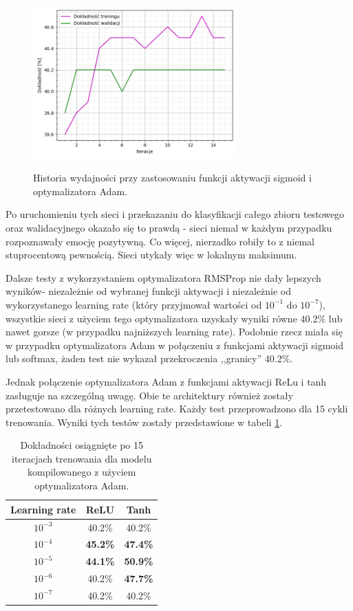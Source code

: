 \begin{figure}[H]
    \caption{Historia wydajności przy zastosowaniu funkcji aktywacji sigmoid i optymalizatora Adam.}
    \centering
    \includegraphics[width=0.7\textwidth]{wykres1.png}
    \label{pic:5.1}
\end{figure}

Po uruchomieniu tych sieci i przekazaniu do klasyfikacji całego zbioru testowego oraz walidacyjnego okazało się to prawdą - sieci niemal w każdym przypadku rozpoznawały emocję pozytywną. Co więcej, nierzadko robiły to z niemal stuprocentową pewnością. Sieci utykały więc w lokalnym maksimum.

Dalsze testy z wykorzystaniem optymalizatora RMSProp nie dały lepszych wyników- niezależnie od wybranej funkcji aktywacji i niezależnie od wykorzystanego learning rate (który przyjmował wartości od $10^{-1}$ do $10^{-7}$), wszystkie sieci z użyciem tego optymalizatora uzyskały wyniki równe 40.2\% lub nawet gorsze (w przypadku najniższych learning rate). Podobnie rzecz miała się w przypadku optymalizatora Adam w połączeniu z funkcjami aktywacji sigmoid lub softmax, żaden test nie wykazał przekroczenia ,,granicy'' 40.2\%.

Jednak połączenie optymalizatora Adam z funkcjami aktywacji ReLu i tanh zasługuje na szczególną uwagę. Obie te architektury również zostały przetestowano dla różnych learning rate. Każdy test przeprowadzono dla 15 cykli trenowania. Wyniki tych testów zostały przedstawione w tabeli \ref{tab:5.2}.

\begin{table}[H]
  \centering
  \caption{Dokładności osiągnięte po 15 iteracjach trenowania dla modelu kompilowanego z użyciem optymalizatora Adam.}
    \begin{tabular}{ |c|c|c| }
    \hline
    Learning rate & ReLU & Tanh \\
    \hline
    $10^{-3}$ & 40.2\% & 40.2\% \\
    $10^{-4}$ & \textbf{45.2\%} & \textbf{47.4\%} \\
    $10^{-5}$ & \textbf{44.1\%} & \textbf{50.9\%} \\
    $10^{-6}$ & 40.2\% & \textbf{47.7\%} \\
    $10^{-7}$ & 40.2\% & 40.2\% \\
    \hline
    \end{tabular}
  \label{tab:5.2}
\end{table}

